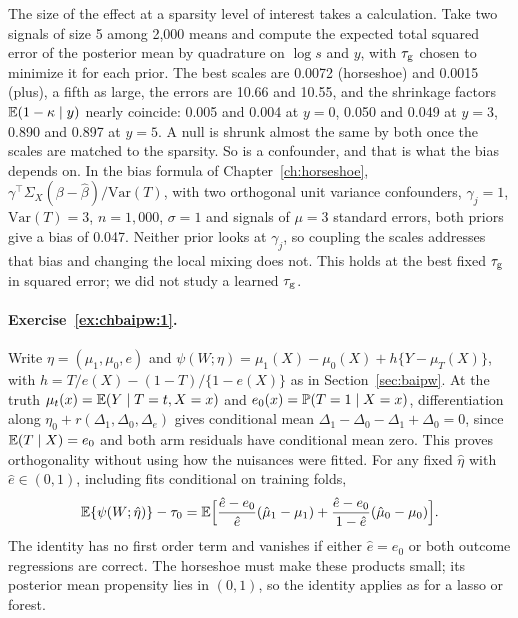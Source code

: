 The size of the effect at a sparsity level of interest takes a calculation. Take two signals of size 5 among 2,000 means and compute the expected total squared error of the posterior mean by quadrature on $\log s$ and $y$, with $\tau_{\mathrm{g}}$ chosen to minimize it for each prior. The best scales are 0.0072 (horseshoe) and 0.0015 (plus), a fifth as large, the errors are 10.66 and 10.55, and the shrinkage factors $\mathbb{E}(1 - \kappa \mid y)$ nearly coincide: 0.005 and 0.004 at $y = 0$, 0.050 and 0.049 at $y = 3$, 0.890 and 0.897 at $y = 5$. A null is shrunk almost the same by both once the scales are matched to the sparsity. So is a confounder, and that is what the bias depends on. In the bias formula of Chapter~\ref{ch:horseshoe}, $\gamma^\top\Sigma_X(\beta - \hat\beta)/\mathrm{Var}(T)$, with two orthogonal unit variance confounders, $\gamma_j = 1$, $\mathrm{Var}(T) = 3$, $n = 1{,}000$, $\sigma = 1$ and signals of $\mu = 3$ standard errors, both priors give a bias of 0.047. Neither prior looks at $\gamma_j$, so coupling the scales addresses that bias and changing the local mixing does not. This holds at the best fixed $\tau_{\mathrm{g}}$ in squared error; we did not study a learned $\tau_{\mathrm{g}}$.

\paragraph{Exercise~\ref{ex:chbaipw:1}.} Write $\eta=(\mu_1,\mu_0,e)$ and $\psi(W;\eta)=\mu_1(X)-\mu_0(X)+h\{Y-\mu_T(X)\}$, with $h=T/e(X)-(1-T)/\{1-e(X)\}$ as in Section~\ref{sec:baipw}. At the truth $\mu_t(x)=\mathbb{E}(Y\mid T=t,X=x)$ and $e_0(x)=\mathbb{P}(T=1\mid X=x)$, differentiation along $\eta_0+r(\Delta_1,\Delta_0,\Delta_e)$ gives conditional mean $\Delta_1-\Delta_0-\Delta_1+\Delta_0=0$, since $\mathbb{E}(T\mid X)=e_0$ and both arm residuals have conditional mean zero. This proves orthogonality without using how the nuisances were fitted. For any fixed $\hat\eta$ with $\hat e\in(0,1)$, including fits conditional on training folds,
\[
\mathbb{E}\{\psi(W;\hat\eta)\}-\tau_0=\mathbb{E}\Bigl[\frac{\hat e-e_0}{\hat e}(\hat\mu_1-\mu_1)+\frac{\hat e-e_0}{1-\hat e}(\hat\mu_0-\mu_0)\Bigr].
\]
The identity has no first order term and vanishes if either $\hat e=e_0$ or both outcome regressions are correct. The horseshoe must make these products small; its posterior mean propensity lies in $(0,1)$, so the identity applies as for a lasso or forest.

